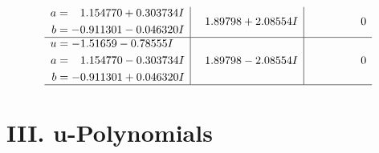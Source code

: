 \documentclass[1p]{elsarticle_modified}
\theoremstyle{definition}
\begin{document}
$$\begin{array}{c|c|c}
\begin{aligned}
a &= \phantom{-}1.154770 + 0.303734 I \\
b &= -0.911301 - 0.046320 I\end{aligned}
 & \phantom{-}1.89798 + 2.08554 I & \phantom{-0.000000 } 0 \\ \hline\begin{aligned}
u &= -1.51659 - 0.78555 I \\
a &= \phantom{-}1.154770 - 0.303734 I \\
b &= -0.911301 + 0.046320 I\end{aligned}
 & \phantom{-}1.89798 - 2.08554 I & \phantom{-0.000000 } 0\\
 \hline 
 \end{array}$$\newpage
\newpage\renewcommand{\arraystretch}{1}
\centering \section*{ III. u-Polynomials}
\end{document}
